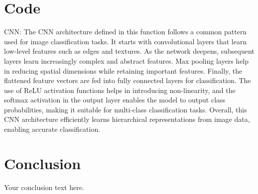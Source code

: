 \documentclass{article}
\begin{document}
\section{Code}
CNN:
    The CNN architecture defined in this function follows a common pattern used for image classification tasks.
    It starts with convolutional layers that learn low-level features such as edges and textures.
    As the network deepens, subsequent layers learn increasingly complex and abstract features.
    Max pooling layers help in reducing spatial dimensions while retaining important features.
    Finally, the flattened feature vectors are fed into fully connected layers for classification.
    The use of ReLU activation functions helps in introducing non-linearity,
    and the softmax activation in the output layer enables the model to output class probabilities,
    making it suitable for multi-class classification tasks.
    Overall, this CNN architecture efficiently learns hierarchical representations from image data,
    enabling accurate classification.

\section{Conclusion}
Your conclusion text here.
\end{document}
